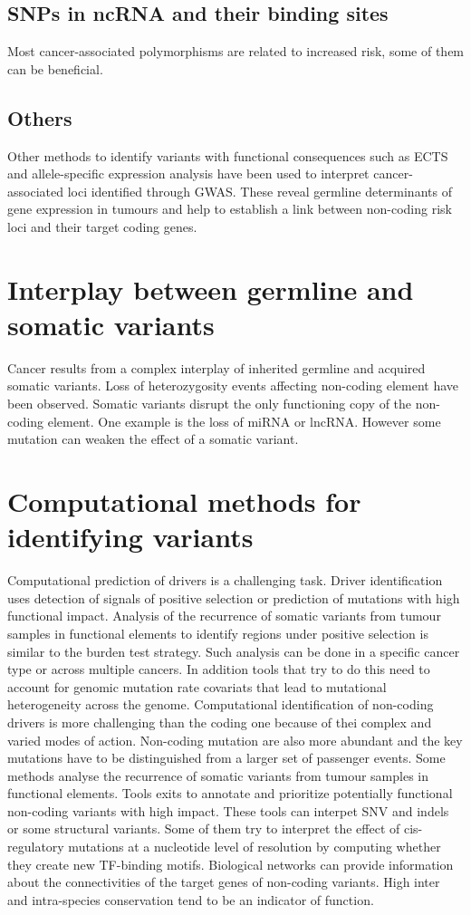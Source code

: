 	\subsection{SNPs in ncRNA and their binding sites}
	Most cancer-associated polymorphisms are related to increased risk, some of them can be beneficial.

	\subsection{Others}
	Other methods to identify variants with functional consequences such as ECTS and allele-specific expression analysis have been used to interpret cancer-associated loci identified through GWAS.
	These reveal germline determinants of gene expression in tumours and help to establish a link between non-coding risk loci and their target coding genes.

\section{Interplay between germline and somatic variants}
Cancer results from a complex interplay of inherited germline and acquired somatic variants.
Loss of heterozygosity events affecting non-coding element have been observed.
Somatic variants disrupt the only functioning copy of the non-coding element.
One example is the loss of miRNA or lncRNA.
However some mutation can weaken the effect of a somatic variant.

\section{Computational methods for identifying variants}
Computational prediction of drivers is a challenging task.
Driver identification uses detection of signals of positive selection or prediction of mutations with high functional impact.
Analysis of the recurrence of somatic variants from tumour samples in functional elements to identify regions under positive selection is similar to the burden test strategy.
Such analysis can be done in a specific cancer type or across multiple cancers.
In addition tools that try to do this need to account for genomic mutation rate covariats that lead to mutational heterogeneity across the genome.
Computational identification of non-coding drivers is more challenging than the coding one because of thei complex and varied modes of action.
Non-coding mutation are also more abundant and the key mutations have to be distinguished from a larger set of passenger events.
Some methods analyse the recurrence of somatic variants from tumour samples in functional elements.
Tools exits to annotate and prioritize potentially functional non-coding variants with high impact.
These tools can interpet SNV and indels or some structural variants.
Some of them try to interpret the effect of cis-regulatory mutations at a nucleotide level of resolution by computing whether they create new TF-binding motifs.
Biological networks can provide information about the connectivities of the target genes of non-coding variants.
High inter and intra-species conservation tend to be an indicator of function.

